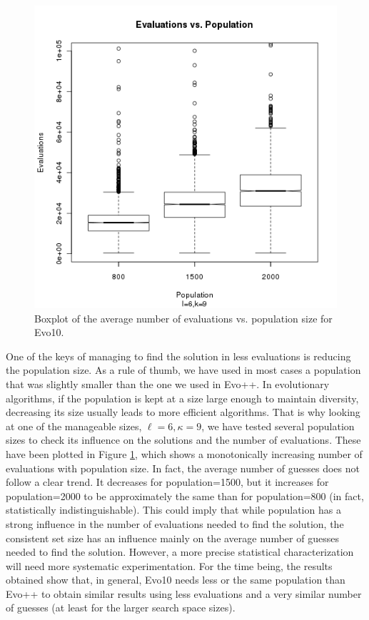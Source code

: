 \documentclass[conference]{IEEEtran}
\begin{document}
%
\begin{figure}[!h]
\centering
\includegraphics[scale=0.50]{eval-vs-pop.png}
\caption{Boxplot of the average number of evaluations 
  vs. population size for Evo10.  \label{fig:eval:pop}}
\end{figure} 
%
One of the keys of managing to find the solution in less evaluations
is reducing the population size. As a rule of thumb, we have used in
most cases a population that was slightly smaller than the one we used
in Evo++. In evolutionary algorithms, if the population is kept at a
size large enough to maintain diversity, decreasing its size usually
leads to more efficient algorithms. That is why looking at one of the
manageable sizes, $\ell=6, \kappa=9$, we have tested several
population sizes to check its influence on the solutions and the
number of evaluations. These have been plotted in Figure
\ref{fig:eval:pop}, which shows a monotonically increasing number of
evaluations with population size. In fact, the average number of
guesses does not follow a clear trend. It decreases for
population=1500, but it increases for population=2000 to be
approximately the same than for population=800 (in fact, statistically
indistinguishable). This could imply that while population has a
strong influence in the number of evaluations needed to find the
solution, the consistent set size has an influence mainly on the
average number of guesses needed to find the solution. However, a more
precise statistical characterization will need more systematic
experimentation. For the time being, the results obtained show that,
in general, Evo10 needs less or the same population than Evo++ to
obtain similar results using less evaluations and a very similar number of
guesses (at least for the larger search space sizes). 
\end{document}
